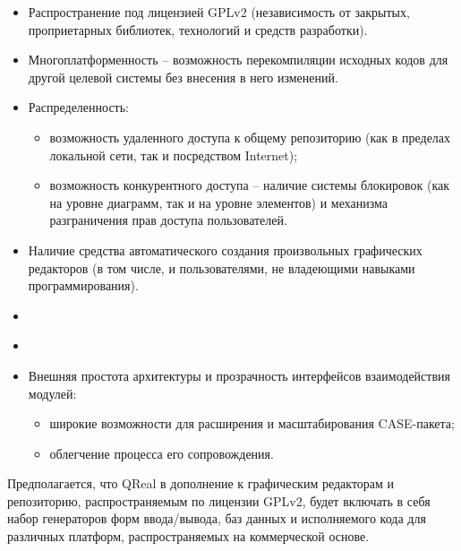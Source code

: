 \documentclass[a4paper]{article}
\newcommand\liststyleWWviiiNumxvi{%
\renewcommand\labelitemi{[F0B7?]}
\renewcommand\labelitemii{o}
\renewcommand\labelitemiii{[F0A7?]}
\renewcommand\labelitemiv{[F0B7?]}
}
\begin{document}
\liststyleWWviiiNumxvi
\begin{itemize}
\item {
Распространение под лицензией \foreignlanguage{english}{GPLv}2
(независимость от закрытых, проприетарных библиотек, технологий и
средств разработки).}
\item {
Многоплатформенность – возможность перекомпиляции исходных кодов для
другой целевой системы без внесения в него изменений.}
\item {
Распределенность:}

\begin{itemize}
\item {
возможность удаленного доступа к общему репозиторию (как в пределах
локальной сети, так и посредством
\foreignlanguage{english}{Internet});}
\item {
возможность конкурентного доступа – наличие системы блокировок (как на
уровне диаграмм, так и на уровне элементов) и механизма разграничения
прав доступа пользователей.}
\end{itemize}
\item {
Наличие средства автоматического создания произвольных графических
редакторов (в том числе, и пользователями, не владеющими навыками
программирования).}
\item 
\bigskip
\item {
}
\item {
Внешняя простота архитектуры и прозрачность интерфейсов взаимодействия
модулей:}

\begin{itemize}
\item {
широкие возможности для расширения и масштабирования
\foreignlanguage{english}{CASE}{}-пакета;}
\item {
облегчение процесса его сопровождения.}
\end{itemize}
\end{itemize}
{
Предполагается, что \foreignlanguage{english}{QReal} в дополнение к
графическим редакторам и репозиторию, распространяемым по лицензии
\foreignlanguage{english}{GPLv}2, будет включать в себя набор
генераторов форм ввода/вывода, баз данных и исполняемого кода для
различных платформ, распространяемых на коммерческой основе.}
\end{document}
